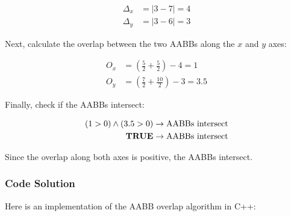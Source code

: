 \begin{equation*}
    \begin{aligned}
        \Delta_x & = \left| 3 - 7 \right| = 4 \\
        \Delta_y & = \left| 3 - 6 \right| = 3
    \end{aligned}
\end{equation*}

Next, calculate the overlap between the two AABBs along the $x$ and $y$ axes:

\begin{equation*}
    \begin{aligned}
        O_x & = \left( \frac{5}{2} + \frac{5}{2} \right) - 4 = 1    \\
        O_y & = \left( \frac{7}{2} + \frac{10}{2} \right) - 3 = 3.5
    \end{aligned}
\end{equation*}

Finally, check if the AABBs intersect:

\begin{equation*}
    \begin{aligned}
        (1 > 0) \land (3.5 > 0)    & \rightarrow \text{AABBs intersect} \\
        \textnormal{\textbf{TRUE}} & \rightarrow \text{AABBs intersect}
    \end{aligned}
\end{equation*}

Since the overlap along both axes is positive, the AABBs intersect.

\subsubsection{Code Solution}

Here is an implementation of the AABB overlap algorithm in C++:

